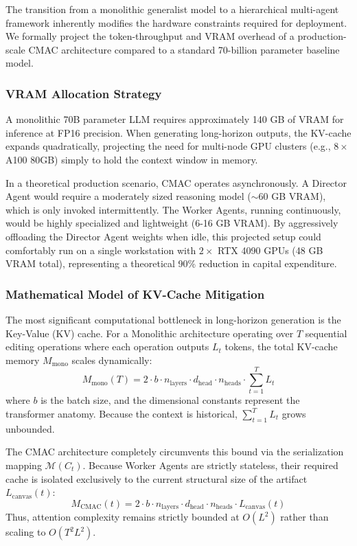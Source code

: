 \documentclass[pdflatex,sn-mathphys-num]{sn-jnl}
\begin{document}
The transition from a monolithic generalist model to a hierarchical multi-agent framework inherently modifies the hardware constraints required for deployment. We formally project the token-throughput and VRAM overhead of a production-scale CMAC architecture compared to a standard 70-billion parameter baseline model.

\subsubsection{VRAM Allocation Strategy}
A monolithic 70B parameter LLM requires approximately 140 GB of VRAM for inference at FP16 precision. When generating long-horizon outputs, the KV-cache expands quadratically, projecting the need for multi-node GPU clusters (e.g., $8 \times$ A100 80GB) simply to hold the context window in memory. 

In a theoretical production scenario, CMAC operates asynchronously. A Director Agent would require a moderately sized reasoning model ($\sim$60 GB VRAM), which is only invoked intermittently. The Worker Agents, running continuously, would be highly specialized and lightweight (6-16 GB VRAM). By aggressively offloading the Director Agent weights when idle, this projected setup could comfortably run on a single workstation with $2 \times$ RTX 4090 GPUs (48 GB VRAM total), representing a theoretical 90\% reduction in capital expenditure.

\subsubsection{Mathematical Model of KV-Cache Mitigation}
The most significant computational bottleneck in long-horizon generation is the Key-Value (KV) cache. For a Monolithic architecture operating over $T$ sequential editing operations where each operation outputs $L_t$ tokens, the total KV-cache memory $M_{\text{mono}}$ scales dynamically:
\begin{equation}
    M_{\text{mono}}(T) = 2 \cdot b \cdot n_{\text{layers}} \cdot d_{\text{head}} \cdot n_{\text{heads}} \cdot \sum_{t=1}^T L_t
\end{equation}
where $b$ is the batch size, and the dimensional constants represent the transformer anatomy. Because the context is historical, $\sum_{t=1}^T L_t$ grows unbounded.

The CMAC architecture completely circumvents this bound via the serialization mapping $\mathcal{M}(C_t)$. Because Worker Agents are strictly stateless, their required cache is isolated exclusively to the current structural size of the artifact $L_{\text{canvas}}(t)$:
\begin{equation}
    M_{\text{CMAC}}(t) = 2 \cdot b \cdot n_{\text{layers}} \cdot d_{\text{head}} \cdot n_{\text{heads}} \cdot L_{\text{canvas}}(t)
\end{equation}
Thus, attention complexity remains strictly bounded at $O(L^2)$ rather than scaling to $O(T^2 L^2)$.
\appendix
\end{document}

